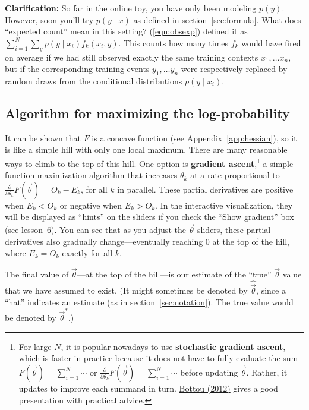 \documentclass[11pt]{article}
\newcommand{\vtheta}{\vec{\theta}}
\newcommand{\diffk}{\frac{\partial}{\partial \theta_k}}
\newcommand{\lesson}[1]{\href{http://cs.jhu.edu/~jason/tutorials/loglin/\##1}{lesson~#1}}
\begin{document}
\medskip
{\bf Clarification:} So far in the online toy, you have only been
modeling $p(y)$.  However, soon you'll try $p(y\mid x)$ as
defined in section~\ref{sec:formula}.  What does ``expected count'' mean in this
setting?  (\ref{eqn:obsexp}) defined it as $\sum_{i=1}^N \sum_y
p(y\mid x_i) f_k(x_i,y)$.  This counts how many times $f_k$ would
have fired on average if we had still observed exactly the same
training contexts $x_1,\ldots x_n$, but if the corresponding training events
$y_1,\ldots y_n$ were respectively replaced by random draws from the
conditional distributions $p(y \mid x_i)$.

\subsection{Algorithm for maximizing the log-probability}\label{sec:concave-claim}

It can be shown that $F$ is a concave function (see Appendix~\ref{app:hessian}), so it is like a simple hill with only one local maximum.  There are many reasonable ways to climb to the top of this hill.  One option is {\bf gradient ascent},\footnote{\label{fn:sgd}For large $N$, it is popular nowadays to use
  {\bf stochastic gradient ascent}, which is faster in practice because it does not have to fully evaluate the sum $F(\vtheta) = \sum_{i=1}^N \cdots$ or $\diffk F(\vtheta) = \sum_{i=1}^N \cdots$ before updating $\vtheta$.  Rather, it updates to improve each summand in turn.  \href{http://research.microsoft.com/pubs/192769/tricks-2012.pdf}{Bottou (2012)} gives a good presentation with practical advice.} a
simple function maximization algorithm that increases $\theta_k$ at a
rate proportional to $\diffk F(\vtheta)=O_k-E_k$, for all $k$ in parallel.
These partial derivatives are positive when $E_k < O_k$ or negative
when $E_k > O_k$.  In the interactive visualization, they will be displayed
as ``hints'' on the sliders if you check the ``Show gradient'' box (see \lesson{6}).
You can see that as you adjust the $\vtheta$ sliders, these partial derivatives 
also gradually change---eventually reaching 0 at the top of the hill, where
$E_k=O_k$ exactly for all $k$.

The final value of $\vtheta$---at the top of the hill---is our estimate of the ``true'' 
$\vtheta$ value that we have assumed to exist.  (It might sometimes be
denoted by $\widehat{\vtheta}$, since a ``hat'' indicates an estimate
(as in section~\ref{sec:notation}).  The true value would be denoted
by $\vtheta^*$.)
\end{document}
